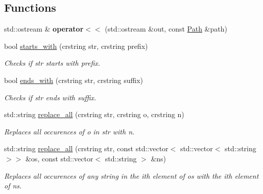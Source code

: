 \subsection*{Functions}
\begin{DoxyCompactItemize}
\item 
\mbox{\label{namespacenta_1_1utils_aafbc0cf6600011397dc89456e14a706f}} 
std\+::ostream \& {\bfseries operator$<$$<$} (std\+::ostream \&out, const \hyperlink{classnta_1_1utils_1_1Path}{Path} \&path)
\item 
\mbox{\label{namespacenta_1_1utils_a9ad5fe63f14dd42c0db25d71e101e85c}} 
bool \hyperlink{namespacenta_1_1utils_a9ad5fe63f14dd42c0db25d71e101e85c}{starts\+\_\+with} (crstring str, crstring prefix)
\begin{DoxyCompactList}\small\item\em Checks if str starts with prefix. \end{DoxyCompactList}\item 
\mbox{\label{namespacenta_1_1utils_aa31e7ef45edfc4fdb60b6459e86b519c}} 
bool \hyperlink{namespacenta_1_1utils_aa31e7ef45edfc4fdb60b6459e86b519c}{ends\+\_\+with} (crstring str, crstring suffix)
\begin{DoxyCompactList}\small\item\em Checks if str ends with suffix. \end{DoxyCompactList}\item 
\mbox{\label{namespacenta_1_1utils_acad0765e34bce437d37871dcf88a9099}} 
std\+::string \hyperlink{namespacenta_1_1utils_acad0765e34bce437d37871dcf88a9099}{replace\+\_\+all} (crstring str, crstring o, crstring n)
\begin{DoxyCompactList}\small\item\em Replaces all occurences of o in str with n. \end{DoxyCompactList}\item 
\mbox{\label{namespacenta_1_1utils_ac35b6baec75cd7b9d9ab7532cc2f9320}} 
std\+::string \hyperlink{namespacenta_1_1utils_ac35b6baec75cd7b9d9ab7532cc2f9320}{replace\+\_\+all} (crstring str, const std\+::vector$<$ std\+::vector$<$ std\+::string $>$$>$ \&os, const std\+::vector$<$ std\+::string $>$ \&ns)
\begin{DoxyCompactList}\small\item\em Replaces all occurences of any string in the ith element of os with the ith element of ns. \end{DoxyCompactList}\item 
$$
\end{DoxyCompactItemize}
